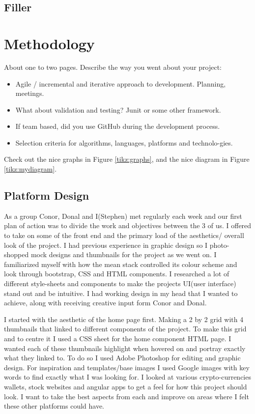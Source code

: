 \section{Filler}



\chapter{Methodology}
About one to two pages.
Describe the way you went about your project:
\begin{itemize}
\item Agile / incremental and iterative approach to development. Planning, meetings.
\item What about validation and testing? Junit or some other framework.
\item If team based, did you use GitHub during the development process.
\item Selection criteria for algorithms, languages, platforms and technolo-gies.
\end{itemize}
Check out the nice graphs in Figure \ref{tikz:graphs}, and the nice diagram in Figure \ref{tikz:mydiagram}.

\section{Platform Design}

As a group Conor, Donal and I(Stephen) met regularly each week and our first plan of action was to divide the work and objectives between the 3 of us. I offered to take on some of the front end and the primary load of the aesthetics/ overall look of the project. I had previous experience in graphic design so I photo-shopped mock designs and thumbnails for the project as we went on. I familiarized myself with how the mean stack controlled its colour scheme and look through bootstrap, CSS and HTML components. I researched a lot of different style-sheets and components to make the projects UI(user interface) stand out and be intuitive. I had working design in my head that I wanted to achieve, along with receiving creative input form Conor and Donal.

I started with the aesthetic of the home page first. Making a 2 by 2 grid with 4 thumbnails that linked to different components of the project. To make this grid and to centre it I used a CSS sheet for the home component HTML page. I wanted each of these thumbnails highlight when hovered on and portray exactly what they linked to. To do so I used Adobe Photoshop for editing and graphic design. For inspiration and templates/base images I used Google images with key words to find exactly what I was looking for. I looked at various crypto-currencies wallets, stock websites and angular apps to get a feel for how this project should look. I want to take the best aspects from each and improve on areas where I felt these other platforms could have. 

